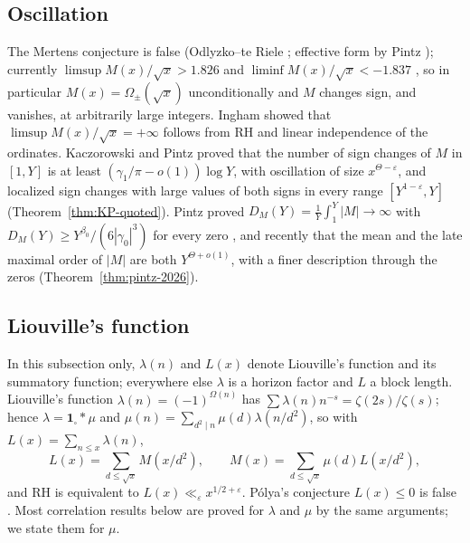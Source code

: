 \documentclass[11pt,reqno]{amsart}
\numberwithin{equation}{section}
\theoremstyle{plain}
\theoremstyle{definition}
\theoremstyle{remark}
\newcommand{\eps}{\varepsilon}
\begin{document}
\subsection{Oscillation}
The Mertens conjecture is false (Odlyzko--te Riele \cite{OdlyzkoTeRiele1985};
effective form by Pintz \cite{Pintz1987}); currently
$\limsup M(x)/\sqrt x>1.826$ and $\liminf M(x)/\sqrt x<-1.837$
\cite{Hurst18}, so in particular $M(x)=\Omega_\pm(\sqrt x)$ unconditionally
and $M$ changes sign, and vanishes, at arbitrarily large integers. Ingham
\cite{Ingham1942} showed that $\limsup M(x)/\sqrt x=+\infty$ follows from RH
and linear independence of the ordinates. Kaczorowski and Pintz \cite{KP86}
proved that the number of sign changes of $M$ in $[1,Y]$ is at least
$(\gamma_1/\pi-o(1))\log Y$, with oscillation of size $x^{\Theta-\eps}$, and
localized sign changes with large values of both signs in every range $[Y^{1-\eps},Y]$
(Theorem~\ref{thm:KP-quoted}). Pintz proved $D_M(Y)=\frac1Y\int_1^Y|M|\to\infty$
with $D_M(Y)\ge Y^{\beta_0}/(6|\gamma_0|^3)$ for every zero
\cite{Pintz1983}, and recently that the mean and the late maximal order of
$|M|$ are both $Y^{\Theta+o(1)}$, with a finer description through the
zeros \cite{Pintz2026} (Theorem~\ref{thm:pintz-2026}).

\subsection{Liouville's function}
\label{subsec:intro-liouville}
In this subsection only, $\lambda(n)$ and $L(x)$ denote Liouville's function
and its summatory function; everywhere else $\lambda$ is a horizon factor and
$L$ a block length. Liouville's function $\lambda(n)=(-1)^{\Omega(n)}$ has
$\sum\lambda(n)n^{-s}=\zeta(2s)/\zeta(s)$; hence $\lambda=\mathbf 1_{\square}*\mu$
and $\mu(n)=\sum_{d^2\mid n}\mu(d)\lambda(n/d^2)$, so with
$L(x)=\sum_{n\le x}\lambda(n)$,
\begin{equation}
L(x)=\sum_{d\le\sqrt x}M(x/d^2),\qquad M(x)=\sum_{d\le\sqrt x}\mu(d)L(x/d^2),
\end{equation}
and RH is equivalent to $L(x)\ll_\eps x^{1/2+\eps}$. Pólya's conjecture
$L(x)\le0$ is false \cite{Haselgrove1958}. Most correlation results below are
proved for $\lambda$ and $\mu$ by the same arguments; we state them for $\mu$.
\end{document}
